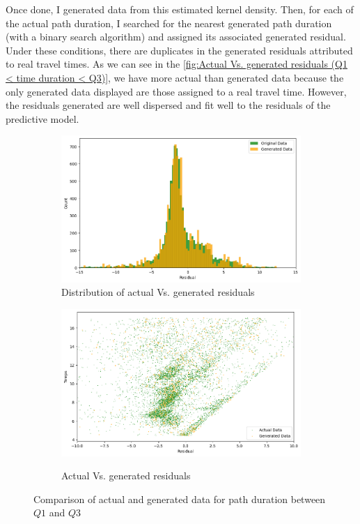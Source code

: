 \documentclass[12pt]{article}
\begin{document}
Once done, I generated data from this estimated kernel density. Then, for each of the actual path duration, I searched for the nearest generated path duration (with a binary search algorithm) and assigned its associated generated residual. Under these conditions, there are duplicates in the generated residuals attributed to real travel times. As we can see in the \autoref{fig:Actual Vs. generated residuals (Q1 < time duration < Q3)}, we have more actual than generated data because the only generated data displayed are those assigned to a real travel time. However, the residuals generated are well dispersed and fit well to the residuals of the predictive model. 
\FloatBarrier
\begin{figure}[ht]
\begin{subfigure}[h]{0.5\linewidth}
\includegraphics[width=\linewidth]{Q1_Q3 distribution actual Vs. generated.png}
    \caption{Distribution of actual Vs. generated residuals}
    \label{fig:Q1_Q3 distribution actual Vs. generated}
\end{subfigure}
\hfill
\begin{subfigure}[h]{0.5\linewidth}
\includegraphics[width=\linewidth]{Q1_Q3 actual Vs. generated.png}\\
    \caption{Actual Vs. generated residuals}
    \label{fig:Actual Vs. generated residuals (Q1 < time duration < Q3)}
\end{subfigure}%
\caption{Comparison of actual and generated data for path duration between $Q1$ and $Q3$}
\end{figure}
\end{document}
